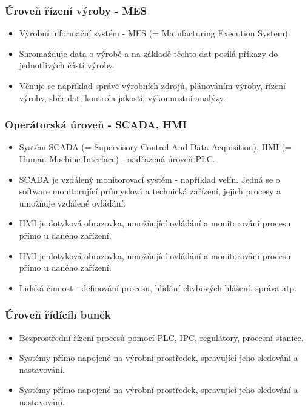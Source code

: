 \subsubsection*{Úroveň řízení výroby - MES}
\begin{itemize}
    \item Výrobní informační systém - MES (= Matufacturing Execution System).
    \item Shromažďuje data o výrobě a na základě těchto dat posílá příkazy do jednotlivých částí výroby.
    \item Věnuje se například správě výrobních zdrojů, plánováním výroby, řízení výroby, sběr dat, kontrola jakosti, výkonnostní analýzy.
\end{itemize}

\subsubsection*{Operátorská úroveň - SCADA, HMI}
\begin{itemize}
    \item Systém SCADA (= Supervisory Control And Data Acquisition), HMI (= Human Machine Interface) - nadřazená úroveň PLC.
    \item SCADA je vzdálený monitorovací systém - například velín. Jedná se o software monitorující průmyslová a technická zařízení, jejich procesy a umožňuje vzdálené ovládání.
    \item HMI je dotyková obrazovka, umožňující ovládání a monitorování procesu přímo u daného zařízení. 
    \item HMI je dotyková obrazovka, umožňující ovládání a monitorování procesu přímo u daného zařízení.
    \item Lidská činnost - definování procesu, hlídání chybových hlášení, správa atp.
\end{itemize}

\subsubsection*{Úroveň řídícíh buněk}
\begin{itemize}
    \item Bezprostřední řízení procesů pomocí PLC, IPC, regulátory, procesní stanice.
    \item Systémy přímo napojené na výrobní prostředek, spravující jeho sledování a nastavování. 
    \item Systémy přímo napojené na výrobní prostředek, spravující jeho sledování a nastavování.
\end{itemize}

